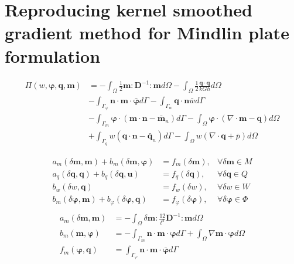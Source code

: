 \section{Reproducing kernel smoothed gradient method for Mindlin plate formulation}\label{sec:rkgsi}
\begin{equation}
\begin{split}
\Pi(w,\boldsymbol \varphi,\boldsymbol q,\boldsymbol m) &=
-\int_{\Omega} \frac{1}{2} \boldsymbol m : \boldsymbol D^{-1} : \boldsymbol m d\Omega -
\int_{\Omega} \frac{1}{2} \frac{\boldsymbol q\cdot \boldsymbol q}{kGh} d\Omega \\ &-
\int_{\Gamma_{\varphi}} \boldsymbol n\cdot \boldsymbol m \cdot \bar{\boldsymbol \varphi} d\Gamma - 
\int_{\Gamma_{w}} \boldsymbol q\cdot\boldsymbol n \bar{w} d\Gamma \\ &-
\int_{\Gamma_{m}} \boldsymbol \varphi\cdot (\boldsymbol m\cdot \boldsymbol n - \bar{\boldsymbol m}_n) d\Gamma -
\int_{\Omega} \boldsymbol \varphi \cdot (\nabla \cdot \boldsymbol m - \boldsymbol q) d\Omega \\ &+
\int_{\Gamma_{q}} w(\boldsymbol q\cdot \boldsymbol n - \bar{\boldsymbol q}_n) d\Gamma - 
\int_{\Omega} w(\nabla \cdot \boldsymbol q + \bar{p}) d\Omega
\end{split}
\end{equation}

\begin{equation}\label{eq:mix_weak_form}
\begin{aligned}
a_m(\delta \boldsymbol m, \boldsymbol m) + b_{m}(\delta\boldsymbol m,\boldsymbol \varphi) &= f_{m}(\delta \boldsymbol m), & \forall \delta \boldsymbol m \in M \\
a_q(\delta \boldsymbol q,\boldsymbol q) + b_q(\delta \boldsymbol q,\boldsymbol u) &= f_{q}(\delta \boldsymbol q), & \forall \delta \boldsymbol q \in Q \\
b_{w}(\delta w,\boldsymbol q) &= f_{w}(\delta w), & \forall \delta w \in W \\
b_m(\delta \boldsymbol \varphi, \boldsymbol m) + b_{\varphi}(\delta\boldsymbol \varphi,\boldsymbol q) &= f_{\varphi}(\delta \boldsymbol \varphi), & \forall \delta \boldsymbol \varphi \in \Phi \\
\end{aligned}
\end{equation}
\begin{align}
a_m(\delta\boldsymbol m,\boldsymbol m) &= -\int_{\Omega} \delta \boldsymbol m : \frac{12}{t^3}\boldsymbol D^{-1}: \boldsymbol m d\Omega \\
b_m(\boldsymbol m, \boldsymbol \varphi) &= - \int_{\Gamma_{m}} \boldsymbol n \cdot \boldsymbol m \cdot \boldsymbol \varphi d\Gamma + \int_{\Omega} \nabla \boldsymbol m \cdot \boldsymbol  \varphi d\Omega\\
f_{m}(\boldsymbol \varphi, \boldsymbol q) &= \int_{\Gamma_{\varphi}} \boldsymbol n \cdot \boldsymbol m\cdot \bar{\boldsymbol \varphi} d\Gamma \\
\end{align}

